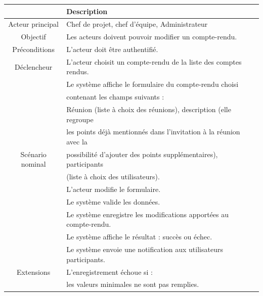 \begin{center}
\begin{tabular}{|c|l|}
\hline 
&\textbf { Description }\\\hline 
    Acteur principal & Chef de projet, chef d’équipe, Administrateur \\\hline 
    Objectif&Les acteurs doivent pouvoir modifier un compte-rendu.\\\hline
    Préconditions&L’acteur doit être authentifié.  \\\hline 
    Déclencheur&L’acteur choisit un compte-rendu de la liste des comptes rendus.\\\hline
    &Le système affiche le formulaire du compte-rendu choisi    \\
    &contenant les champs suivants :    \\
    &Réunion (liste à choix des réunions), description (elle regroupe  \\
    &les points déjà mentionnés dans l’invitation à la réunion avec la      \\
    Scénario nominal& possibilité d’ajouter des points supplémentaires), participants    \\&(liste à choix des utilisateurs).\\&L’acteur modifie le formulaire. \\
    &Le système valide les données. \\&Le système enregistre les modifications apportées au compte-rendu.  \\&Le système affiche le résultat : succès ou échec.  \\&Le système envoie une notification aux utilisateurs participants.\\\hline
    Extensions&   L’enregistrement échoue si :\\&les valeurs minimales ne sont pas remplies.\\\hline
\end{tabular}
\label{desc_modif_cmpterendu}
\end{center}
\newpage
